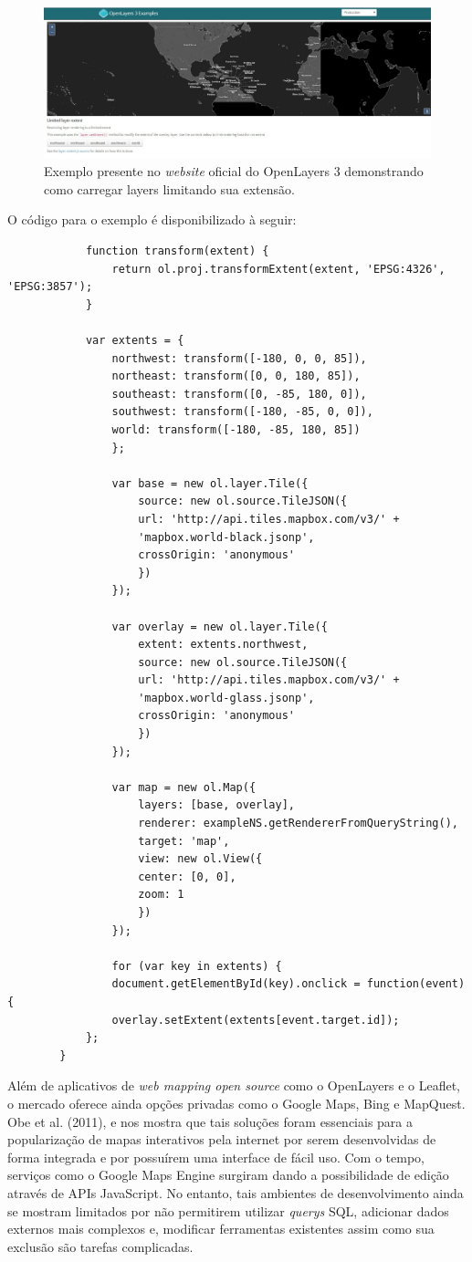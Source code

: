 		\begin{figure}
			\centering
			\includegraphics[width=1\linewidth]{data/openlayers}
			\caption{Exemplo presente no \textit{website} oficial do OpenLayers 3 demonstrando como carregar layers limitando sua extensão.}
			\label{fig:openlayers}
		\end{figure}
		
		O código para o exemplo é disponibilizado à seguir: 
		
		\begin{lstlisting}
			function transform(extent) {
				return ol.proj.transformExtent(extent, 'EPSG:4326', 'EPSG:3857');
			}
			
			var extents = {
				northwest: transform([-180, 0, 0, 85]),
				northeast: transform([0, 0, 180, 85]),
				southeast: transform([0, -85, 180, 0]),
				southwest: transform([-180, -85, 0, 0]),
				world: transform([-180, -85, 180, 85])
				};
				
				var base = new ol.layer.Tile({
					source: new ol.source.TileJSON({
					url: 'http://api.tiles.mapbox.com/v3/' +
					'mapbox.world-black.jsonp',
					crossOrigin: 'anonymous'
					})
				});
				
				var overlay = new ol.layer.Tile({
					extent: extents.northwest,
					source: new ol.source.TileJSON({
					url: 'http://api.tiles.mapbox.com/v3/' +
					'mapbox.world-glass.jsonp',
					crossOrigin: 'anonymous'
					})
				});
				
				var map = new ol.Map({
					layers: [base, overlay],
					renderer: exampleNS.getRendererFromQueryString(),
					target: 'map',
					view: new ol.View({
					center: [0, 0],
					zoom: 1
					})
				});
				
				for (var key in extents) {
				document.getElementById(key).onclick = function(event) {
				overlay.setExtent(extents[event.target.id]);
			};
		}
		\end{lstlisting}
		
		Além de aplicativos de \textit{web mapping open source} como o OpenLayers e o Leaflet, o mercado oferece ainda opções privadas como o Google Maps, Bing e MapQuest. Obe et al. (2011), e nos mostra que tais soluções foram essenciais para a popularização de mapas interativos pela internet por serem desenvolvidas de forma integrada e por possuírem uma interface de fácil uso. Com o tempo, serviços como o Google Maps Engine surgiram dando a possibilidade de edição através de APIs JavaScript. No entanto, tais ambientes de desenvolvimento ainda se mostram limitados por não permitirem utilizar \textit{querys} SQL, adicionar dados externos mais complexos e, modificar ferramentas existentes assim como sua exclusão são tarefas complicadas. 
		
		